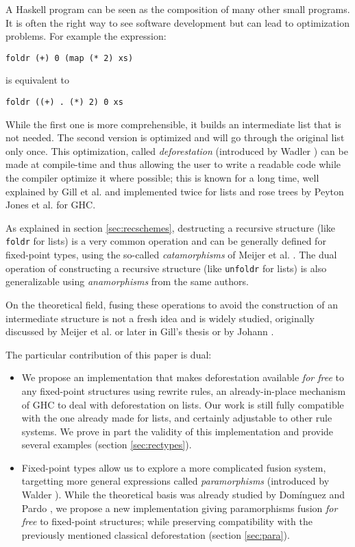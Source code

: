 \documentclass[format=sigplan, review=true, anonymous=true]{acmart}
\newcommand{\hs}[1]{\texttt{#1}}
\begin{document}
A Haskell program can be seen as the composition of many other small programs. It is often the right way to see software development but can lead to optimization problems. For example the expression:
\begin{verbatim}
foldr (+) 0 (map (* 2) xs)
\end{verbatim}
is equivalent to
\begin{verbatim}
foldr ((+) . (*) 2) 0 xs
\end{verbatim}

\noindent While the first one is more comprehensible, it builds an intermediate list that is not needed. The second version is optimized and will go through the original list only once.
This optimization, called \emph{deforestation} (introduced by Wadler \cite{WADLER1990231}) can be made at compile-time and thus allowing the user to write a readable code while the compiler optimize it where possible; this is known for a long time, well explained by Gill et al. \cite{Gill:1993:SCD:165180.165214} and implemented twice for lists and rose trees by Peyton Jones et al. \cite{pbr} for GHC.

As explained in section \ref{sec:recschemes}, destructing a recursive structure (like \hs{foldr} for lists) is a very common operation and can be generally defined for fixed-point types, using the so-called \emph{catamorphisms} of Meijer et al. \cite{4cec4a43c86444479dc0003182424795}. The dual operation of constructing a recursive structure (like \hs{unfoldr} for lists) is also generalizable using \emph{anamorphisms} from the same authors.

On the theoretical field, fusing these operations to avoid the construction of an intermediate structure is not a fresh idea and is widely studied, originally discussed by Meijer et al. \cite{4cec4a43c86444479dc0003182424795} or later in Gill's thesis \cite{Gill1996CheapDF} or by Johann \cite{Johann:2002:GSF:641433.641471}.

The particular contribution of this paper is dual:
\begin{itemize}
\item We propose an implementation that makes deforestation available \emph{for free} to any fixed-point structures using rewrite rules, an already-in-place mechanism of GHC to deal with deforestation on lists. Our work is still fully compatible with the one already made for lists, and certainly adjustable to other rule systems. We prove in part the validity of this implementation and provide several examples (section \ref{sec:rectypes}).
\item Fixed-point types allow us to explore a more complicated fusion system, targetting more general expressions called \emph{paramorphisms} (introduced by Walder \cite{Meertens1992}). While the theoretical basis was already studied by Domínguez and Pardo \cite{paramorphismFusion}, we propose a new implementation giving paramorphisms fusion \emph{for free} to fixed-point structures; while preserving compatibility with the previously mentioned classical deforestation (section \ref{sec:para}).
\end{itemize}
\end{document}
